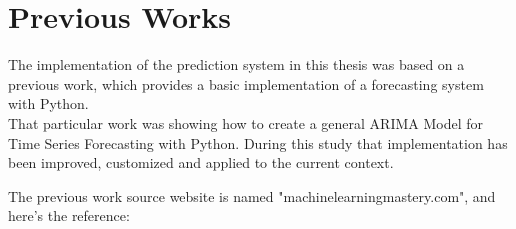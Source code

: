 \section{Previous Works}
\vspace{-5mm}
The implementation of the prediction system in this thesis was based on a previous work, which provides a basic implementation of a forecasting system with Python.\\
That particular work was showing how to create a general ARIMA Model for Time Series Forecasting with Python. During this study that implementation has been improved, customized and applied to the current context.

The previous work source website is named "machinelearningmastery.com", and here's the reference: \cite{previousWork}


